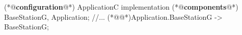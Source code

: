 \begin{Sbox}
\begin{minipage}{\columnwidth}
\begin{csource}
(*@\textbf{configuration}@*) ApplicationC {
}implementation {
  (*@\textbf{components}@*) BaseStationG, Application;
  //...
  (*@@*)Application.BaseStationG -> BaseStationG;
}
\end{csource}
\end{minipage}
\end{Sbox}